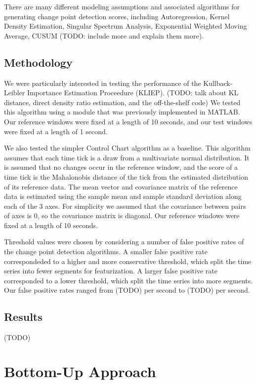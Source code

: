 \documentclass[onehalf,11pt]{beavtex}
\begin{document}
There are many different modeling assumptions and associated algorithms
for generating change point detection scores,
including Autoregression, Kernel Density Estimation, Singular Spectrum
Analysis, Exponential Weighted Moving Average, CUSUM
(TODO: include more and explain them more).

\section{Methodology}
We were particularly interested in testing the performance of the
Kullback-Leibler Importance Estimation Proceedure (KLIEP).
(TODO: talk about KL distance, direct density ratio estimation, and the off-the-shelf code)
We tested this algorithm using a module that was previously implemented in MATLAB.
Our reference windows were fixed at a length of 10 seconds, and our test
windows were fixed at a length of 1 second.

We also tested the simpler Control Chart algorithm as a baseline. This
algorithm assumes that each time tick is a draw from a multivariate normal distribution.
It is assumed that no changes occur in the reference window, and the score of a time
tick is the Mahalonobis distance of the tick from the estimated distribution of its reference data.
The mean vector and covariance matrix of the reference data is estimated using
the sample mean and sample standard deviation along each of the 3 axes. For simplicity
we assumed that the covariance between pairs of axes is 0, so the covariance matrix is
diagonal. Our reference windows were fixed at a length of 10 seconds. 

Threshold values were chosen by considering a number of false positive rates of
the change point detection algorithms. A smaller false positive rate 
correspondeded to a higher and more conservative threshold, which split the
time series into fewer segments for featurization. A larger false positive rate
corresponded to a lower threshold, which split the time series into more segments.
Our false positive rates ranged from (TODO) per second to (TODO) per second.

\section{Results}
(TODO)


\chapter{Bottom-Up Approach}
\end{document}
